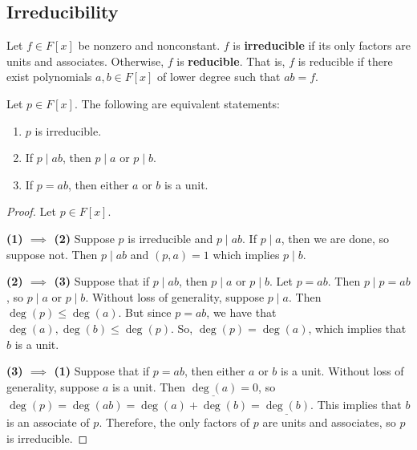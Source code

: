 \documentclass [12pt] {article}
\newenvironment{definition}[1]{\begin{tcolorbox}[title={Definition: #1},colback=blue!5!white,colframe=black!75!blue]}{\end{tcolorbox}}
\newenvironment{theorem}[1]{\begin{tcolorbox}[title={Theorem #1},colback=green!5!white,colframe=black!75!green]}{\end{tcolorbox}}
\renewcommand{\bf}[1]{\textbf{{#1}}}
\newcommand{\ul}[1]{\underline{{#1}}}
\begin{document}
\subsection{Irreducibility}
\begin{definition}{Irreducible}
    Let $f \in F[x]$ be nonzero and nonconstant. $f$ is \bf{irreducible} if its only factors are
    units and associates. Otherwise, $f$ is \bf{reducible}. That is, $f$ is reducible if there exist
    polynomials $a, b \in F[x]$ of lower degree such that $ab = f$.
\end{definition}

\begin{theorem}{}
    Let $p \in F[x]$. The following are equivalent statements:
    \begin{enumerate}[label=(\arabic*)]
        \item $p$ is irreducible.
        \item If $p \mid ab$, then $p \mid a$ or $p \mid b$.
        \item If $p = ab$, then either $a$ or $b$ is a unit.
    \end{enumerate}
\end{theorem}
\begin{proof}
    Let $p \in F[x]$.
    \vspace{0.5em}

    \bf{(1) $\bm{\implies}$ (2)}
    Suppose $p$ is irreducible and $p \mid ab$. If $p \mid a$, then we are done, so suppose not.
    Then $p \mid ab$ and $(p, a) = 1$ which implies $p \mid b$.
    \vspace{0.5em}

    \bf{(2) $\bm{\implies}$ (3)}
    Suppose that if $p \mid ab$, then $p \mid a$ or $p \mid b$. Let $p = ab$. Then $p \mid p = ab$,
    so $p \mid a$ or $p \mid b$. Without loss of generality, suppose $p \mid a$. Then
    $\deg(p) \leq \deg(a)$. But since $p = ab$, we have that $\deg(a), \deg(b) \leq \deg(p)$. So,
    $\deg(p) = \deg(a)$, which implies that $b$ is a unit.

    \vspace{0.5em}

    \bf{(3) $\bm{\implies}$ (1)}
    Suppose that if $p = ab$, then either $a$ or $b$ is a unit. Without loss of generality, suppose
    $a$ is a unit. Then $\ul{\deg(a)} = 0$, so
    $\deg(p) = \deg(ab) = \deg(a) + \deg(b) = \ul{\deg(b)}$. This
    implies that $b$ is an associate of $p$. Therefore, the only factors of $p$ are units and
    associates, so $p$ is irreducible.
\end{proof}
\end{document}
